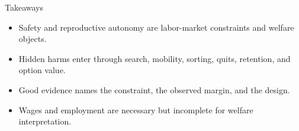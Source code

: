 \documentclass[aspectratio=169,11pt]{beamer}
\begin{document}
\begin{frame}{Takeaways}
\begin{itemize}
    \item Safety and reproductive autonomy are labor-market constraints and welfare objects.
    \item Hidden harms enter through search, mobility, sorting, quits, retention, and option value.
    \item Good evidence names the constraint, the observed margin, and the design.
    \item Wages and employment are necessary but incomplete for welfare interpretation.
\end{itemize}
\end{frame}
\end{document}
